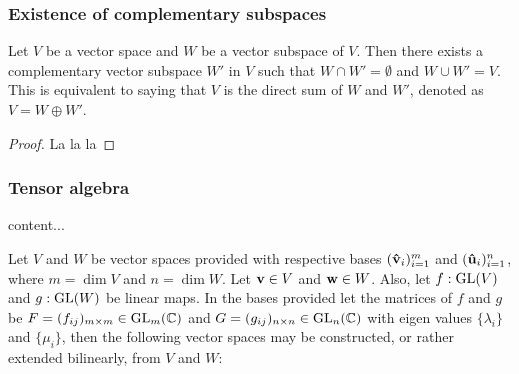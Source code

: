 	\subsubsection{Existence of complementary subspaces}
	
	\begin{corollary}\label{thm:compsubspaces}
		Let $V$ be a vector space and $W$ be a vector subspace of $V$. Then there exists a complementary vector subspace $W'$ in $V$ such that $W \cap W' = \emptyset$ and $W \cup W' = V$. This is equivalent to saying that $V$ is the direct sum of $W$ and $W'$, denoted as $V = W \oplus W'$.
	\end{corollary}
	\begin{proof}
		La la la
	\end{proof}
	
	\subsubsection{Tensor algebra}
	
		\begin{definition}[Bilinearity]
			content...
		\end{definition}
	
		Let $V$ and $W$ be vector spaces provided with respective bases $(\mathbf{\hat{v}}_i)_{i=1}^m$ and $(\mathbf{\hat{u}}_i)_{i=1}^n$, where $m = \dim V$ and $n = \dim W$. Let $\mathbf{v} \in V$ and $\mathbf{w} \in W$. Also, let $f: \text{GL}(V)$ and $g: \text{GL}(W)$ be linear maps. In the bases provided let the matrices of $f$ and $g$ be $F=(f_{ij})_{m \times m} \in \text{GL}_m(\mathbb{C})$ and $G = (g_{ij})_{n \times n} \in \text{GL}_n(\mathbb{C})$ with eigen values $\{\lambda_i\}$ and $\{\mu_i\}$, then the following vector spaces may be constructed, or rather extended bilinearly, from $V$ and $W$:
		

